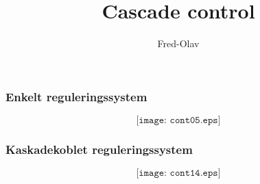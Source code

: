 \documentclass{beamer}
\title{Cascade control}
\author{Fred-Olav}
\begin{document}
\maketitle

\begin{frame}
	\frametitle{Enkelt reguleringssystem}

	
$$\texttt{[image: cont05.eps]}$$


\end{frame}





\begin{frame}
	\frametitle{Kaskadekoblet reguleringssystem}

	
$$\texttt{[image: cont14.eps]}$$


\end{frame}
\end{document}
